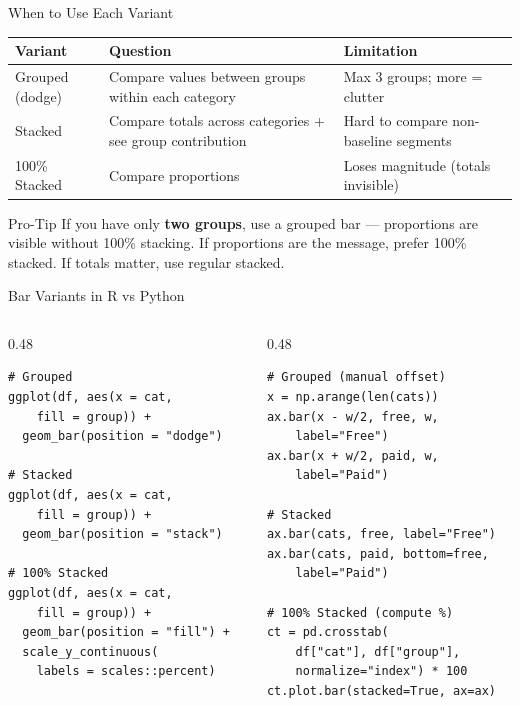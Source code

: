 \documentclass[10pt]{beamer}
\begin{document}
\begin{frame}{When to Use Each Variant}
  \centering
  \begin{tabular}{lp{4cm}p{4cm}}
    \toprule
    \textbf{Variant} & \textbf{Question} & \textbf{Limitation} \\
    \midrule
    Grouped (dodge) & Compare values between groups within each category & Max 3 groups; more = clutter \\
    Stacked & Compare totals across categories + see group contribution & Hard to compare non-baseline segments \\
    100\% Stacked & Compare proportions & Loses magnitude (totals invisible) \\
    \bottomrule
  \end{tabular}

  \vspace{6pt}
  \begin{alertblock}{Pro-Tip}
    If you have only \textbf{two groups}, use a grouped bar --- proportions
    are visible without 100\% stacking. If proportions are the message,
    prefer 100\% stacked. If totals matter, use regular stacked.
  \end{alertblock}
\end{frame}

\begin{frame}[fragile]{Bar Variants in R vs Python}
  \begin{columns}[T]
    \begin{column}{0.48\textwidth}
\begin{lstlisting}[style=rstyle]
# Grouped
ggplot(df, aes(x = cat,
    fill = group)) +
  geom_bar(position = "dodge")

# Stacked
ggplot(df, aes(x = cat,
    fill = group)) +
  geom_bar(position = "stack")

# 100% Stacked
ggplot(df, aes(x = cat,
    fill = group)) +
  geom_bar(position = "fill") +
  scale_y_continuous(
    labels = scales::percent)
\end{lstlisting}
    \end{column}
    \begin{column}{0.48\textwidth}
\begin{lstlisting}[style=pythonstyle]
# Grouped (manual offset)
x = np.arange(len(cats))
ax.bar(x - w/2, free, w,
    label="Free")
ax.bar(x + w/2, paid, w,
    label="Paid")

# Stacked
ax.bar(cats, free, label="Free")
ax.bar(cats, paid, bottom=free,
    label="Paid")

# 100% Stacked (compute %)
ct = pd.crosstab(
    df["cat"], df["group"],
    normalize="index") * 100
ct.plot.bar(stacked=True, ax=ax)
\end{lstlisting}
    \end{column}
  \end{columns}
\end{frame}
\end{document}
